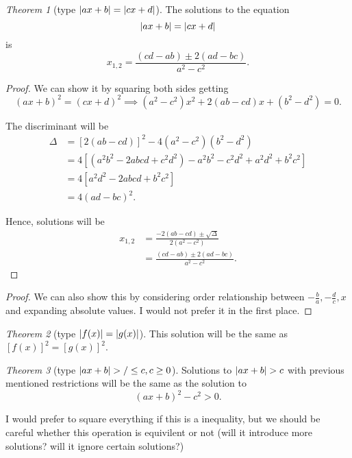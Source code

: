 \documentclass[8pt]{article}
\theoremstyle{remark}
\newtheorem{theorem}{Theorem}[section]
\begin{document}
        \begin{theorem}[type $\left\lvert ax + b \right\rvert = \left\lvert cx + d \right\rvert$]
            The solutions to the equation
            $$
            \left\lvert ax + b \right\rvert = \left\lvert cx + d \right\rvert
            $$
            is
            $$
            x_{1, 2} = \frac{(cd - ab) \pm 2 (ad - bc)}{a^2 - c^2}.
            $$

            \begin{proof}
                We can show it by squaring both sides getting
                $$
                (ax + b)^2 = (cx + d)^2 \implies (a^2 - c^2)x^2 + 2(ab - cd) x + (b^2 - d^2) = 0.
                $$

                The discriminant will be
                \begin{align*}
                    \Delta &= [2(ab - cd)]^2 - 4 (a^2 - c^2) (b^2 - d^2)\\
                    &= 4 [(a^2 b^2 - 2abcd + c^2 d^2) - a^2b^2 - c^2d^2 + a^2 d^2 + b^2 c^2]\\
                    &= 4 [a^2 d^2 - 2abcd + b^2 c^2]\\
                    &= 4 (ad - bc)^2.
                \end{align*}

                Hence, solutions will be
                \begin{align*}
                    x_{1, 2} &= \frac{- 2 (ab - cd) \pm \sqrt{\Delta}}{2 (a^2 - c^2)}\\
                    &= \frac{(cd - ab) \pm 2 (ad - bc)}{a^2 - c^2}.
                \end{align*}
            \end{proof}

            \begin{proof}
                We can also show this by considering order relationship between $-\frac{b}{a}, - \frac{d}{c}, x$ and expanding absolute values. I would not prefer it in the first place.
            \end{proof}
        \end{theorem}

        \begin{theorem}[type $\left\lvert f(x) \right\rvert = \left\lvert g(x) \right\rvert$]
            This solution will be the same as $[f(x)]^2 = [g(x)]^2$.
        \end{theorem}

        \begin{theorem}[type $\left\lvert ax + b \right\rvert > / \leq c, c \geq 0$]
            Solutions to $\left\lvert ax + b \right\rvert > c$ with previous mentioned restrictions will be the same as the solution to
            $$
                (ax + b)^2 - c^2 > 0.
            $$

            I would prefer to square everything if this is a inequality, but we should be careful whether this operation is equivilent or not (will it introduce more solutions? will it ignore certain solutions?)
        \end{theorem}
\end{document}
